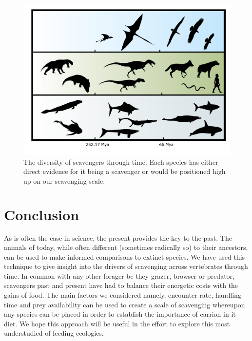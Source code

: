\documentclass[a4paper,12pt]{article}
\begin{document}
\begin{figure}[!htbp]
\centering
   \includegraphics[width=1\textwidth]{timeline_figure/timeLine.pdf}
\caption{The diversity of scavengers through time. Each species has either direct evidence for it being a scavenger or would be positioned high up on our scavenging scale.}
\label{Timeline}
\end{figure}


\section*{Conclusion} 
As is often the case in science, the present provides the key to the past.
The animals of today, while often different (sometimes radically so) to their ancestors, can be used to make informed comparisons to extinct species. 
We have used this technique to give insight into the drivers of scavenging across vertebrates through time.
In common with any other forager be they grazer, browser or predator, scavengers past and present have had to balance their energetic costs with the gains of food. 
The main factors we considered namely, encounter rate, handling time and prey availability can be used to create a scale of scavenging whereupon any species can be placed in order to establish the importance of carrion in it diet.
We hope this approach will be useful in the effort to explore this most understudied of feeding ecologies. 

\end{document}
